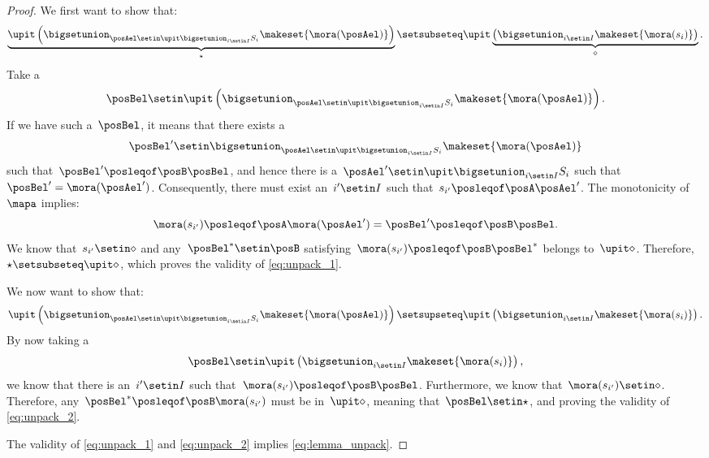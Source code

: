 \begin{proof}
    We first want to show that:
    \begin{equation}
        \label{eq:unpack_1}
        \underbrace{\upit \left(\bigsetunion_{\posAel \setin \upit \bigsetunion_{i\setin I}S_i}\makeset{\mora(\posAel)} \right)}_{\star}\setsubseteq \upit \underbrace{\left( \bigsetunion_{i\setin I}\makeset{\mora(s_i)}\right)}_{\diamond}.
    \end{equation}
    Take a
    \begin{equation}
        \posBel \setin \upit\left( \bigsetunion_{\posAel \setin \upit \bigsetunion_{i\setin I}S_i}\makeset{\mora(\posAel)}\right).
    \end{equation}
    If we have such a~$\posBel$, it means that there exists a
    \begin{equation}
        \posBel'\setin \bigsetunion_{\posAel\setin \upit\bigsetunion_{i\setin I}S_i}\makeset{\mora(\posAel)}
    \end{equation}
    such that~$\posBel'\posleqof\posB \posBel$, and hence there is a~$\posAel'\setin \upit \bigsetunion_{i\setin I} S_i$ such that~$\posBel'=\mora(\posAel')$.
    Consequently, there must exist an~$i'\setin I$ such that~$s_{i'}\posleqof\posA \posAel'$.
    The monotonicity of~$\mapa$ implies:
    \begin{equation}
        \mora(s_{i'})\posleqof\posA \mora(\posAel')=\posBel'\posleqof\posB \posBel.
    \end{equation}
    We know that~$s_{i'}\setin \diamond$ and any~$\posBel^*\setin \posB$ satisfying~$\mora(s_{i'})\posleqof\posB \posBel^*$ belongs to~$\upit \diamond$.
    Therefore,~$\star\setsubseteq \upit \diamond$, which proves the validity of \cref{eq:unpack_1}.

    We now want to show that:
    \begin{equation}
        \label{eq:unpack_2}
        \upit \left(\bigsetunion_{\posAel \setin \upit \bigsetunion_{i\setin I}S_i}\makeset{\mora(\posAel)} \right)\setsupseteq \upit \left( \bigsetunion_{i\setin I}\makeset{\mora(s_i)}\right).
    \end{equation}
    By now taking a
    \begin{equation}
        \posBel\setin \upit \left( \bigsetunion_{i\setin I}\makeset{\mora(s_i)}\right),
    \end{equation}
    we know that there is an~$i'\setin I$ such that~$\mora(s_{i'})\posleqof\posB \posBel$.
    Furthermore, we know that~$\mora(s_{i'})\setin \diamond$.
    Therefore, any~$\posBel^*\posleqof\posB \mora(s_{i'})$ must be in~$\upit \diamond$, meaning that~$\posBel\setin \star$, and proving the validity of \cref{eq:unpack_2}.

    The validity of \cref{eq:unpack_1} and \cref{eq:unpack_2} implies \cref{eq:lemma_unpack}.
\end{proof}

